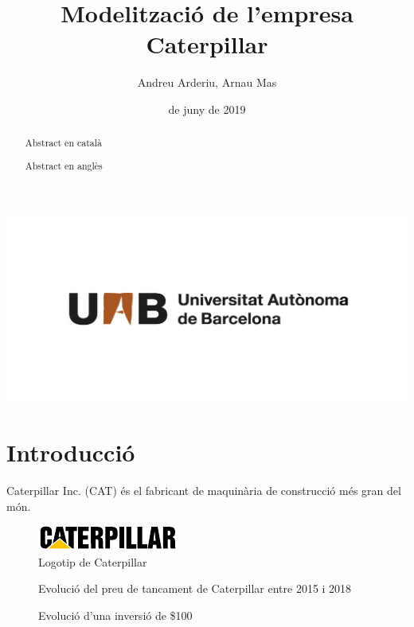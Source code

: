 \documentclass{article}
\title{\sffamily \bfseries Modelització de l'empresa Caterpillar}
\author{\sffamily Andreu Arderiu, Arnau Mas}
\date{\sffamily 14 de juny de 2019}
\numberwithin{table}{section}
\numberwithin{figure}{section}
\numberwithin{equation}{section}
\begin{document}
\begin{titlepage}
	\clearpage
	\maketitle	

	\renewcommand{\abstractname}{\bfseries \sffamily Resum:}
	\begin{abstract}
		Abstract en català
	\end{abstract}

	\renewcommand{\abstractname}{\bfseries \sffamily Abstract:}
	\begin{abstract}
		Abstract en anglès
	\end{abstract}
	\center \includegraphics[scale = 0.3]{uab}
\end{titlepage}

\section{Introducció}
Caterpillar Inc. (CAT) és el fabricant de maquinària de construcció més gran del món. 

\begin{figure}[htb]
	\centering \small \sffamily
	\includegraphics[scale = 1.5]{cat-logo}
	\caption{Logotip de Caterpillar}
	\label{fig:logo}
\end{figure}

\begin{figure}[htb]
	\centering \sffamily \small
	
	\caption{Evolució del preu de tancament de Caterpillar entre 2015 i 2018}
	\label{fig:serie preus}
\end{figure}

\begin{figure}[htb]
	\centering \sffamily \small
	
	\caption{Evolució d'una inversió de \$100}
	\label{fig:inversio}
\end{figure}
\end{document}
